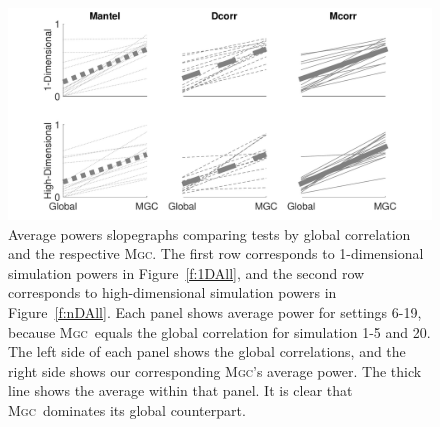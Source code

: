 \documentclass[11pt]{article}
\providecommand{\sct}[1]{{\normalfont\textsc{#1}}}
\newcommand{\Mgc}{\sct{Mgc}}
\newcommand{\Mgcp}{\sct{Mgc$_P$}}
\newcommand{\Hhg}{\sct{Hhg}}
\newcommand{\Dcorr}{\sct{Dcorr}}
\newcommand{\Mcorr}{\sct{Mcorr}}
\newcommand{\Mantel}{\sct{Mantel}}
\begin{document}


\begin{figure}
  \centering
  \includegraphics[width=1.0\textwidth]{../Figures/FigSlope}
  \caption{
Average powers slopegraphs comparing tests by global correlation and the respective \Mgc. The first row corresponds to 1-dimensional simulation powers in Figure~\ref{f:1DAll}, and the second row corresponds to high-dimensional simulation powers in Figure~\ref{f:nDAll}. Each panel shows average power for settings 6-19, because \Mgc~equals the global correlation for simulation 1-5 and  20. The left side of each panel shows the global correlations, and the right side shows our corresponding \Mgc's average power. The thick line shows the average within that panel. It is clear that \Mgc~dominates its global counterpart. 
}
\label{f:pp}
\end{figure}

\end{document}

